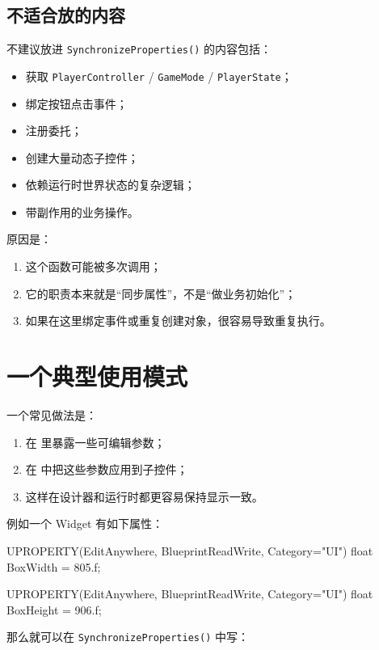 \documentclass[10pt,CJKmath]{ctexart}
\begin{document}
\subsection{不适合放的内容}

不建议放进 \texttt{SynchronizeProperties()} 的内容包括：

\begin{itemize}
	\item 获取 \texttt{PlayerController} / \texttt{GameMode} / \texttt{PlayerState}；
	\item 绑定按钮点击事件；
	\item 注册委托；
	\item 创建大量动态子控件；
	\item 依赖运行时世界状态的复杂逻辑；
	\item 带副作用的业务操作。
\end{itemize}

原因是：

\begin{enumerate}
	\item 这个函数可能被多次调用；
	\item 它的职责本来就是“同步属性”，不是“做业务初始化”；
	\item 如果在这里绑定事件或重复创建对象，很容易导致重复执行。
\end{enumerate}

\section{一个典型使用模式}

一个常见做法是：

\begin{enumerate}
	\item 在  里暴露一些可编辑参数；
	\item 在  中把这些参数应用到子控件；
	\item 这样在设计器和运行时都更容易保持显示一致。
\end{enumerate}

例如一个 Widget 有如下属性：

\begin{code}
	UPROPERTY(EditAnywhere, BlueprintReadWrite, Category="UI")
	float BoxWidth = 805.f;
	
	UPROPERTY(EditAnywhere, BlueprintReadWrite, Category="UI")
	float BoxHeight = 906.f;
\end{code}

那么就可以在 \texttt{SynchronizeProperties()} 中写：
\end{document}
